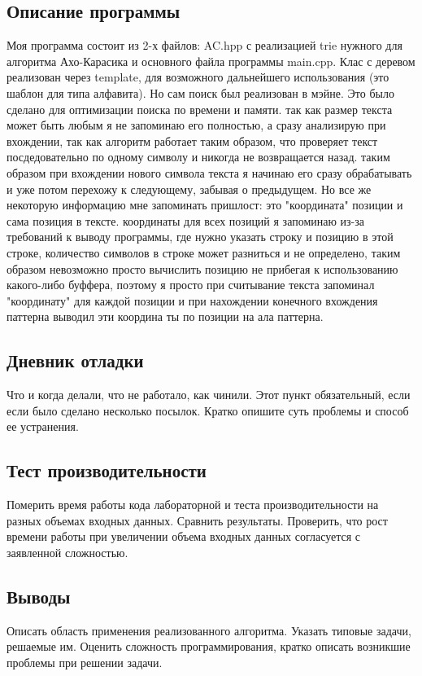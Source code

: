 \documentclass[12pt]{article}
\begin{document}
\subsection*{Описание программы}

Моя программа состоит из 2-х файлов: AC.hpp с реализацией trie нужного для алгоритма Ахо-Карасика и основного файла программы main.cpp. Клас с деревом реализован через template, для возможного дальнейшего использования (это шаблон для типа алфавита). Но сам поиск был реализован в мэйне. Это было сделано для оптимизации поиска по времени и памяти. так как размер текста может быть любым я не запоминаю его полностью, а сразу анализирую при вхождении, так как алгоритм работает таким образом, что проверяет текст посдедовательно по одному символу и никогда не возвращается назад. таким образом при вхождении нового символа текста я начинаю его сразу обрабатывать и уже потом перехожу к следующему, забывая о предыдущем. Но все же некоторую информацию мне запоминать пришлост: это "координата" позиции и сама позиция в тексте. координаты для всех позиций я запоминаю из-за требований к выводу программы, где нужно указать строку и позицию в этой строке, количество символов в строке может разниться и не определено, таким образом невозможно просто вычислить позицию не прибегая к использованию какого-либо буффера, поэтому я просто при считывание текста запоминал "координату" для каждой позиции и при нахождении конечного вхождения паттерна выводил эти координа ты по позиции на ала паттерна.

\subsection*{Дневник отладки}

Что и когда делали, что не работало, как чинили.
Этот пункт обязательный, если если было сделано несколько
посылок. Кратко опишите суть проблемы и способ ее устранения.

\subsection*{Тест производительности}

Померить время работы кода лабораторной и теста производительности
на разных объемах входных данных. Сравнить результаты. Проверить,
что рост времени работы при увеличении объема входных данных
согласуется с заявленной сложностью.


\subsection*{Выводы}

Описать область применения реализованного алгоритма. Указать типовые
задачи, решаемые им. Оценить сложность программирования, кратко
описать возникшие проблемы при решении задачи. 
\end{document}
